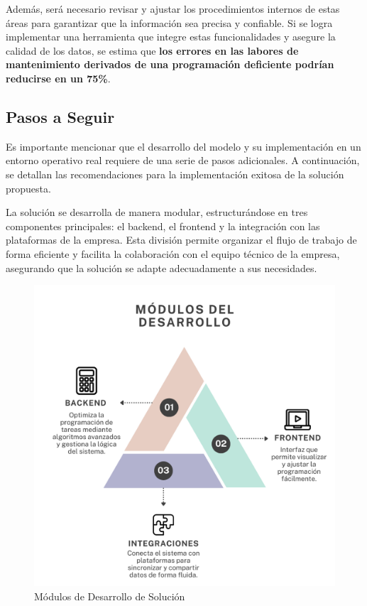 \documentclass{article}
\begin{document}
Además, será necesario revisar y ajustar los procedimientos internos de estas áreas para garantizar que la información sea precisa y confiable. Si se logra implementar una herramienta que integre estas funcionalidades y asegure la calidad de los datos, se estima que \textbf{los errores en las labores de mantenimiento derivados de una programación deficiente podrían reducirse en un 75\%}.

\subsection{Pasos a Seguir}

Es importante mencionar que el desarrollo del modelo y su implementación en un entorno operativo real requiere de una serie de pasos adicionales. A continuación, se detallan las recomendaciones para la implementación exitosa de la solución propuesta.

La solución se desarrolla de manera modular, estructurándose en tres componentes principales: el backend, el frontend y la integración con las plataformas de la empresa. Esta división permite organizar el flujo de trabajo de forma eficiente y facilita la colaboración con el equipo técnico de la empresa, asegurando que la solución se adapte adecuadamente a sus necesidades.

\begin{figure}[htbp]
  \centering
  \includegraphics[scale=0.3]{imgs/ModulosDesarrollo.png}
  \caption{Módulos de Desarrollo de Solución}
  \label{fig:modulos-desarrollo}
\end{figure}
\end{document}
